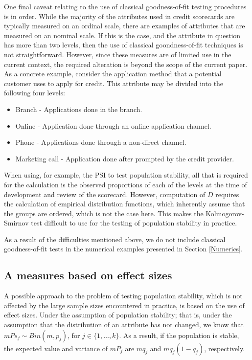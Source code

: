 \documentclass{article}
\theoremstyle{def}
\begin{document}
One final caveat relating to the use of classical goodness-of-fit testing procedures is in order. While the majority of the attributes used in credit scorecards are typically measured on an ordinal scale, there are examples of attributes that are measured on an nominal scale. If this is the case, and the attribute in question has more than two levels, then the use of classical goondness-of-fit techniques is not straightforward. However, since these measures are of limited use in the current context, the required alteration is beyond the scope of the current paper. As a concrete example, consider the application method that a potential customer uses to apply for credit. This attribute may be divided into the following four levels:
\begin{itemize}
    \item Branch - Applications done in the branch.
    \item Online - Application done through an online application channel.
    \item Phone - Applications done through a non-direct channel.
    \item Marketing call - Application done after prompted by the credit provider.
\end{itemize}
When using, for example, the PSI to test population stability, all that is required for the calculation is the observed proportions of each of the levels at the time of development and review of the scorecard. However, computation of $D$ requires the calculation of empirical distribution functions, which inherently assume that the groups are ordered, which is not the case here. This makes the Kolmogorov-Smirnov test difficult to use for the testing of population stability in practice.

As a result of the difficulties mentioned above, we do not include classical goodness-of-fit tests in the numerical examples presented in Section \ref{Numerics}.

\subsection{A measures based on effect sizes}

A possible approach to the problem of testing population stability, which is not affected by the large sample sizes encountered in practice, is based on the use of effect sizes. Under the assumption of population stability; that is, under the assumption that the distribution of an attribute has not changed, we know that $mPs_j \sim Bin(m,p_j)$, for $j \in \{1,\dots,k\}$. As a result, if the population is stable, the expected value and variance of $mP_j$ are $mq_j$ and $mq_j(1-q_j)$, respectively. %
\end{document}
